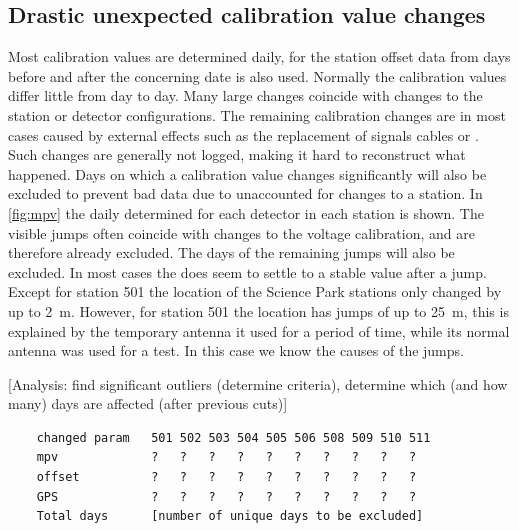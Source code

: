 \subsection{Drastic unexpected calibration value changes}

Most calibration values are determined daily, for the station offset data from days before and after the concerning date is also used. Normally the calibration values differ little from day to day. Many large changes coincide with changes to the station or detector configurations. The remaining calibration changes are in most cases caused by external effects such as the replacement of signals cables or \pmts. Such changes are generally not logged, making it hard to reconstruct what happened. Days on which a calibration value changes significantly will also be excluded to prevent bad data due to unaccounted for changes to a station. In \cref{fig:mpv} the daily determined \mpv for each detector in each station is shown. The visible jumps often coincide with changes to the \pmt voltage calibration, and are therefore already excluded. The days of the remaining jumps will also be excluded. In most cases the \mpv does seem to settle to a stable value after a jump. Except for station 501 the \gps location of the Science Park stations only changed by up to \SI{2}{\meter}. However, for station 501 the \gps location has jumps of up to \SI{25}{\meter}, this is explained by the temporary \gps antenna it used for a period of time, while its normal \gps antenna was used for a test. In this case we know the causes of the jumps.

[Analysis: find significant outliers (determine criteria), determine which (and how many) days are affected (after previous cuts)]

\begin{verbatim}
    changed param   501 502 503 504 505 506 508 509 510 511
    mpv             ?   ?   ?   ?   ?   ?   ?   ?   ?   ?
    offset          ?   ?   ?   ?   ?   ?   ?   ?   ?   ?
    GPS             ?   ?   ?   ?   ?   ?   ?   ?   ?   ?
    Total days      [number of unique days to be excluded]
\end{verbatim}

